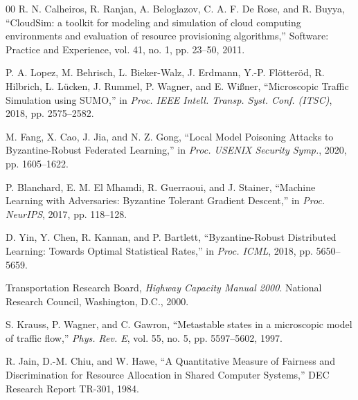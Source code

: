 \documentclass[conference]{IEEEtran}
\begin{document}
\begin{thebibliography}{00}
 R. N. Calheiros, R. Ranjan, A. Beloglazov, C. A. F. De Rose, and R. Buyya, ``CloudSim: a toolkit for modeling and simulation of cloud computing environments and evaluation of resource provisioning algorithms,'' Software: Practice and Experience, vol. 41, no. 1, pp. 23--50, 2011.

 P. A. Lopez, M. Behrisch, L. Bieker-Walz, J. Erdmann, Y.-P. Fl\"otter\"od, R. Hilbrich, L. L\"ucken, J. Rummel, P. Wagner, and E. Wi\ss{}ner, ``Microscopic Traffic Simulation using SUMO,'' in \emph{Proc. IEEE Intell. Transp. Syst. Conf. (ITSC)}, 2018, pp. 2575--2582.

 M. Fang, X. Cao, J. Jia, and N. Z. Gong, ``Local Model Poisoning Attacks to Byzantine-Robust Federated Learning,'' in \emph{Proc. USENIX Security Symp.}, 2020, pp. 1605--1622.

 P. Blanchard, E. M. El Mhamdi, R. Guerraoui, and J. Stainer, ``Machine Learning with Adversaries: Byzantine Tolerant Gradient Descent,'' in \emph{Proc. NeurIPS}, 2017, pp. 118--128.

 D. Yin, Y. Chen, R. Kannan, and P. Bartlett, ``Byzantine-Robust Distributed Learning: Towards Optimal Statistical Rates,'' in \emph{Proc. ICML}, 2018, pp. 5650--5659.

 Transportation Research Board, \emph{Highway Capacity Manual 2000}. National Research Council, Washington, D.C., 2000.

 S. Krauss, P. Wagner, and C. Gawron, ``Metastable states in a microscopic model of traffic flow,'' \emph{Phys. Rev. E}, vol. 55, no. 5, pp. 5597--5602, 1997.

 R. Jain, D.-M. Chiu, and W. Hawe, ``A Quantitative Measure of Fairness and Discrimination for Resource Allocation in Shared Computer Systems,'' DEC Research Report TR-301, 1984.

\end{thebibliography}
\end{document}
